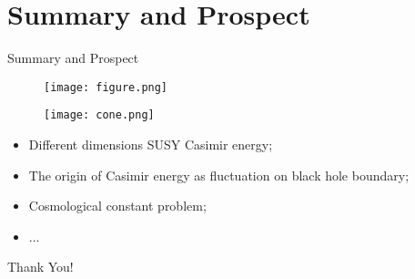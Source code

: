 \documentclass{beamer}
\begin{document}
\section{Summary and Prospect}
\begin{frame}{Summary and Prospect}
    \begin{multicols}{2}
    \begin{figure}
        \centering
        \texttt{[image: figure.png]}
    \end{figure}
    \begin{figure}
        \centering
        \texttt{[image: cone.png]}
    \end{figure}
    \end{multicols}
    \begin{itemize}
        \item Different dimensions SUSY Casimir energy;
        \item The origin of Casimir energy as fluctuation on black hole boundary;
        \item Cosmological constant problem;
        \item ...
    \end{itemize}
\end{frame}
\begin{frame}
    \begin{center}
    \Huge {\color{red}Thank You!}
    \end{center}
\end{frame}
\end{document}
